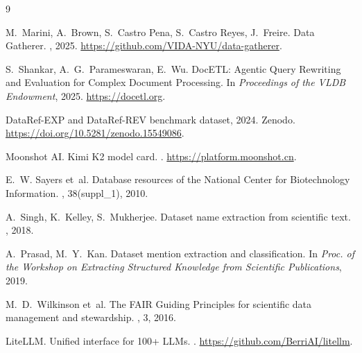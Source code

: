 \documentclass[sigconf,nonacm]{acmart}
\begin{document}

\begin{thebibliography}{9}

M.~Marini, A.~Brown, S.~Castro Pena, S.~Castro Reyes, J.~Freire.
\newblock Data Gatherer.
, 2025.
\newblock \url{https://github.com/VIDA-NYU/data-gatherer}.

S.~Shankar, A.~G.~Parameswaran, E.~Wu.
\newblock DocETL: Agentic Query Rewriting and Evaluation for Complex Document Processing.
\newblock In {\em Proceedings of the VLDB Endowment}, 2025.
\newblock \url{https://docetl.org}.

DataRef-EXP and DataRef-REV benchmark dataset, 2024.
\newblock Zenodo. \url{https://doi.org/10.5281/zenodo.15549086}.

Moonshot AI.
\newblock Kimi K2 model card.
. \url{https://platform.moonshot.cn}.

E.~W. Sayers et~al.
\newblock Database resources of the National Center for Biotechnology Information.
, 38(suppl\_1), 2010.

A.~Singh, K.~Kelley, S.~Mukherjee.
\newblock Dataset name extraction from scientific text.
, 2018.

A.~Prasad, M.~Y.~Kan.
\newblock Dataset mention extraction and classification.
\newblock In {\em Proc. of the Workshop on Extracting Structured Knowledge from Scientific Publications}, 2019.

M.~D.~Wilkinson et~al.
\newblock The FAIR Guiding Principles for scientific data management and stewardship.
, 3, 2016.

LiteLLM.
\newblock Unified interface for 100+ LLMs.
. \url{https://github.com/BerriAI/litellm}.

\end{thebibliography}
\end{document}
